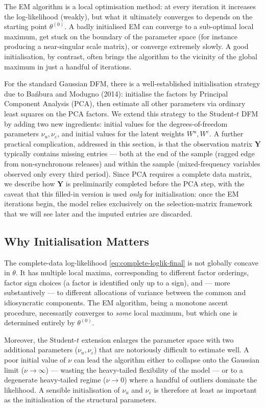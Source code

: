 \documentclass[11pt, a4paper, oneside]{article}
\newcommand{\mY}{\mathbf{Y}}
\begin{document}
The EM algorithm is a local optimisation method: at every iteration it
increases the log-likelihood (weakly), but what it ultimately converges
to depends on the starting point $\theta^{(0)}$. A badly initialised EM
can converge to a sub-optimal local maximum, get stuck on the boundary
of the parameter space (for instance producing a near-singular scale
matrix), or converge extremely slowly. A good initialisation, by
contrast, often brings the algorithm to the vicinity of the global
maximum in just a handful of iterations.

For the standard Gaussian DFM, there is a well-established initialisation
strategy due to Bańbura and Modugno (2014): initialise the factors by
Principal Component Analysis (PCA), then estimate all other parameters
via ordinary least squares on the PCA factors. We extend this strategy
to the Student-$t$ DFM by adding two new ingredients: initial values
for the degrees-of-freedom parameters $\nu_u, \nu_\varepsilon$, and
initial values for the latent weights $W^u, W^\varepsilon$. A further
practical complication, addressed in this section, is that the
observation matrix $\mY$ typically contains missing entries — both at
the end of the sample (ragged edge from non-synchronous releases) and
within the sample (mixed-frequency variables observed only every third
period). Since PCA requires a complete data matrix, we describe how
$\mY$ is preliminarily completed before the PCA step, with the
caveat that this filled-in version is used \emph{only} for
initialisation: once the EM iterations begin, the model relies
exclusively on the selection-matrix framework
that we will see later and the imputed entries are discarded.

\subsection{Why Initialisation Matters}

The complete-data log-likelihood
\eqref{eq:complete-loglik-final} is not globally concave in $\theta$.
It has multiple local maxima, corresponding to different factor
orderings, factor sign choices (a factor is identified only up to a
sign), and — more substantively — to different allocations of variance
between the common and idiosyncratic components. The EM algorithm,
being a monotone ascent procedure, necessarily converges to \emph{some}
local maximum, but which one is determined entirely by $\theta^{(0)}$.

Moreover, the Student-$t$ extension enlarges the parameter space with
two additional parameters ($\nu_u, \nu_\varepsilon$) that are
notoriously difficult to estimate well. A poor initial value of $\nu$
can lead the algorithm either to collapse onto the Gaussian limit
($\nu \to \infty$) — wasting the heavy-tailed flexibility of the model —
or to a degenerate heavy-tailed regime ($\nu \to 0$) where a handful of
outliers dominate the likelihood. A sensible initialisation of $\nu_u$
and $\nu_\varepsilon$ is therefore at least as important as the
initialisation of the structural parameters.
\end{document}

